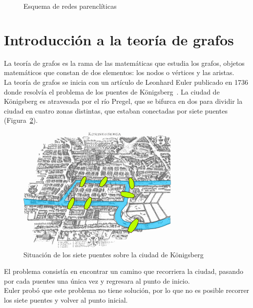 \begin{figure}[htbp!]
	\begin{center}
		\resizebox{\textwidth}{!}{%
			\redesparencliticas
		}
	\end{center}
	\caption{Esquema de redes parenclíticas}
	\label{fig:redesparencliticas}
\end{figure}

\section{Introducción a la teoría de grafos}

La teoría de grafos es la rama de las matemáticas que estudia los grafos, objetos matemáticos que constan de dos elementos: los nodos o vértices y las aristas.\\

La teoría de grafos se inicia con un artículo de Leonhard Euler publicado en 1736 donde resolvía el problema de los puentes de Königsberg~\cite{Euler1736}. La ciudad de Königsberg es atravesada por el río Pregel, que se bifurca en dos para dividir la ciudad en cuatro zonas distintas, que estaban conectadas por siete puentes (Figura~\ref{fig:bridges}).\\

\begin{figure}[htbp!]
\centering
\includegraphics[width=0.6\linewidth]{imagenes/bridges}
\caption{Situación de los siete puentes sobre la ciudad de Königsberg}
\label{fig:bridges}
\end{figure}

El problema consistía en encontrar un camino que recorriera la ciudad, pasando por cada puentes una única vez y regresara al punto de inicio.\\

Euler probó que este problema no tiene solución, por lo que no es posible recorrer los siete puentes y volver al punto inicial.\\

